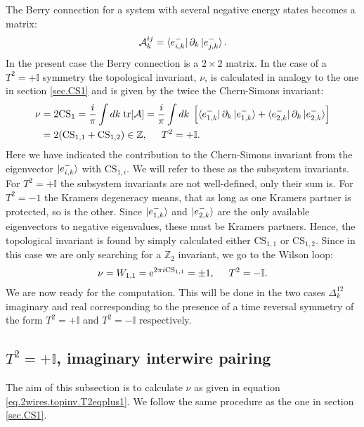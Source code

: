 The Berry connection for a system with several negative energy states becomes a matrix:
\begin{equation}
\mathcal{A}^{ij}_k = \bra{e^{-}_{i,k}}\partial_k\ket{e^{-}_{j,k}}.
\end{equation}
In the present case the Berry connection is a $2\times 2$ matrix. In the case of a $T^2 = + \mathbb{I}$ symmetry the topological invariant, $\nu$, is calculated in analogy to the one in section \ref{sec.CS1} and is given by the twice the Chern-Simons invariant:
\begin{align}
\nu &= 2\text{CS}_1 = \frac{i}{\pi} \int dk\; \text{tr}[\mathcal{A}] = \frac{i}{\pi} \int dk\; \left[\bra{e^{-}_{1,k}}\partial_k\ket{e^{-}_{1,k}} + \bra{e^{-}_{2,k}}\partial_k\ket{e^{-}_{2,k}}  \right] \nonumber \\
 &= 2(\text{CS}_{1,1} + \text{CS}_{1,2})\in \mathbb{Z}, \hspace{0.5cm} T^2 = +\mathbb{I}.
\label{eq.2wires.topinv.T2eqplus1}
\end{align}
Here we have indicated the contribution to the Chern-Simons invariant from the eigenvector $\ket{e^{-}_{i,k}}$ with $\text{CS}_{1,i}$. We will refer to these as the subsystem invariants. For $T^2 = +\mathbb{I}$ the subsystem invariants are not well-defined, only their sum is. For $T^2 = -1$ the Kramers degeneracy means, that as long as one Kramers partner is protected, so is the other. Since $\ket{e^{-}_{1,k}}$ and $\ket{e^{-}_{2,k}}$ are the only available eigenvectors to negative eigenvalues, these must be Kramers partners. Hence, the topological invariant is found by simply calculated either $\text{CS}_{1,1}$ or $\text{CS}_{1,2}$\cite{FuKane2006, LiYangChen}. Since in this case we are only searching for a $\mathbb{Z}_2$ invariant, we go to the Wilson loop:
\begin{equation}
\nu = W_{1,1} = \text{e}^{2\pi i\text{CS}_{1,1}} = \pm 1, \hspace{0.5cm} T^2 = -\mathbb{I}.
\label{eq.2wires.topinv.T2eqminus1}
\end{equation}
We are now ready for the computation. This will be done in the two cases $\Delta^{12}_k$ imaginary and real corresponding to the presence of a time reversal symmetry of the form $T^2 = +\mathbb{I}$ and $T^2 = -\mathbb{I}$ respectively. 

\subsection{$T^2 = +\mathbb{I}$, imaginary interwire pairing}
\label{subsec.2wires_CSinv_Delta12imag}
The aim of this subsection is to calculate $\nu$ as given in equation \eqref{eq.2wires.topinv.T2eqplus1}. We follow the same procedure as the one in section \ref{sec.CS1}. 

